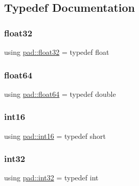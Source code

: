 \subsection{Typedef Documentation}
\mbox{\label{namespacepad_a0620ec4561a638bdbef1530ccf90fd4b}} 
\subsubsection{\texorpdfstring{float32}{float32}}
{\footnotesize\ttfamily using \mbox{\hyperlink{namespacepad_a0620ec4561a638bdbef1530ccf90fd4b}{pad\+::float32}} = typedef float}

\mbox{\label{namespacepad_a0b20ee3154cbe817a8d34c9e4b3b0508}} 
\subsubsection{\texorpdfstring{float64}{float64}}
{\footnotesize\ttfamily using \mbox{\hyperlink{namespacepad_a0b20ee3154cbe817a8d34c9e4b3b0508}{pad\+::float64}} = typedef double}

\mbox{\label{namespacepad_ab1a45c1f61489add8bf3a4c7a563d67a}} 
\subsubsection{\texorpdfstring{int16}{int16}}
{\footnotesize\ttfamily using \mbox{\hyperlink{namespacepad_ab1a45c1f61489add8bf3a4c7a563d67a}{pad\+::int16}} = typedef short}

\mbox{\label{namespacepad_a7faacd72761782d8adef66f2feba3c21}} 
\subsubsection{\texorpdfstring{int32}{int32}}
{\footnotesize\ttfamily using \mbox{\hyperlink{namespacepad_a7faacd72761782d8adef66f2feba3c21}{pad\+::int32}} = typedef int}

\mbox{\label{namespacepad_a91b3934f581b6b83d2618e069a120fdd}} 
